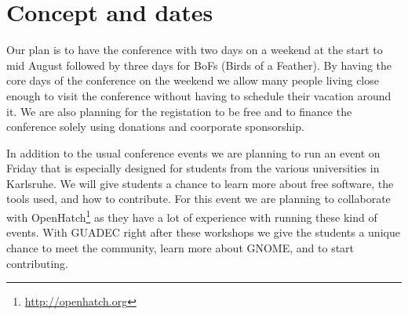 
\newpage




\begin{tikzpicture}
\end{tikzpicture}

\vspace*{8.5cm}

\section{Concept and dates}

Our plan is to have the conference with two days on a weekend at the start to mid
August followed by three days for BoFs (Birds of a Feather). By having the core
days of the conference on the weekend we allow many people living close enough to visit
the conference without having to schedule their vacation around it. We are also
planning for the registation to be free and to finance the conference solely
using donations and coorporate sponsorship.

In addition to the usual conference events we are planning to run an event
on Friday that is especially designed for students from the various universities
in Karlsruhe. We will give students a chance to learn more about free software,
the tools used, and how to contribute. For this event we are planning to collaborate with
OpenHatch\footnote{\url{http://openhatch.org}} as they have a lot of experience
with running these kind of events. With GUADEC right after these workshops
we give the students a unique chance to meet the community, learn more about GNOME,
and to start contributing.

